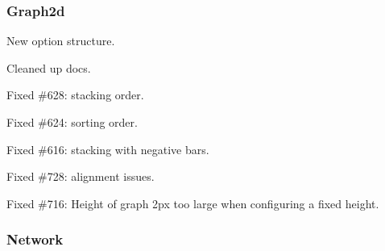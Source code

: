 \subsubsection*{Graph2d}


\begin{DoxyItemize}
\item New option structure.
\item Cleaned up docs.
\item Fixed \#628\+: stacking order.
\item Fixed \#624\+: sorting order.
\item Fixed \#616\+: stacking with negative bars.
\item Fixed \#728\+: alignment issues.
\item Fixed \#716\+: Height of graph {\ttfamily 2px} too large when configuring a fixed height.
\end{DoxyItemize}

\subsubsection*{Network}

